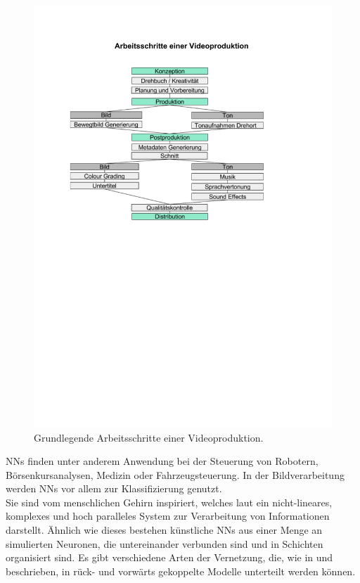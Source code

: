 \documentclass[times, 12pt,twocolumn]{article}
\begin{document}
\begin{figure}
	\flushleft
	\includegraphics[width=\columnwidth, trim = 20mm 145mm 45mm 40mm, clip]{Bilder/ArbeitsschritteVideoproduktion.pdf}
	\caption{Grundlegende Arbeitsschritte einer Videoproduktion.}
	\label{fig:Videoproduktion}
\end{figure}
 \label{sec:NeuronaleNetze}

NNs finden unter anderem Anwendung bei der Steuerung von Robotern, Börsenkursanalysen, Medizin oder Fahrzeugsteuerung. In der Bildverarbeitung werden NNs vor allem zur Klassifizierung genutzt. \\
Sie sind vom menschlichen Gehirn inspiriert, welches laut \cite{NNHaykin} ein nicht-lineares, komplexes und hoch paralleles System zur Verarbeitung von Informationen darstellt. Ähnlich wie dieses bestehen künstliche NNs aus einer Menge an simulierten Neuronen, die untereinander verbunden sind und in Schichten organisiert sind. Es gibt verschiedene Arten der Vernetzung, die, wie in \cite{NNHaykin} und \cite{NNStanley} beschrieben, in rück- und vorwärts gekoppelte Modelle unterteilt werden können.\\
\end{document}
